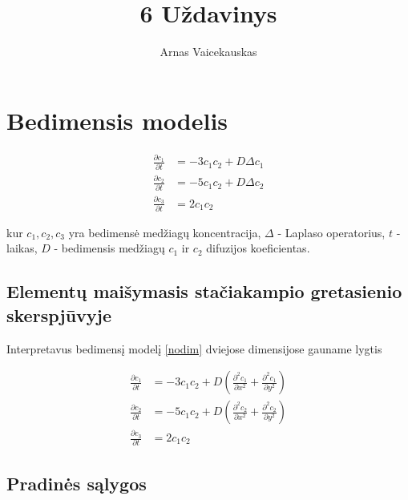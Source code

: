 \documentclass{article}
\title{6 Uždavinys}
\author{Arnas Vaicekauskas}
\begin{document}
\maketitle

\section{Bedimensis modelis}

\begin{subequations} \label{nodim}
    \begin{align}
    \frac{\partial c_1}{\partial t}&=-3c_1c_2+D\Delta c_1\\
    \frac{\partial c_2}{\partial t}&=-5c_1c_2+D\Delta c_2\\
    \frac{\partial c_3}{\partial t}&=2c_1c_2
    \end{align}
\end{subequations}

kur $c_1,c_2,c_3$ yra bedimensė medžiagų koncentracija, 
$\Delta$ - Laplaso operatorius, $t$ - laikas, 
$D$ - bedimensis medžiagų $c_1$ ir $c_2$ difuzijos koeficientas.

\subsection{Elementų maišymasis stačiakampio gretasienio skerspjūvyje}

Interpretavus bedimensį modelį \eqref{nodim} dviejose dimensijose gauname lygtis

\begin{subequations} \label{nodim}
    \begin{align}
    \frac{\partial c_1}{\partial t}&=-3c_1c_2+D\left(\frac{\partial^2c_1}{\partial x^2}+\frac{\partial^2c_1}{\partial y^2}\right)\\
    \frac{\partial c_2}{\partial t}&=-5c_1c_2+D\left(\frac{\partial^2c_2}{\partial x^2}+\frac{\partial^2c_2}{\partial y^2}\right)\\
    \frac{\partial c_3}{\partial t}&=2c_1c_2
    \end{align}
\end{subequations}

\subsection{Pradinės sąlygos}
\end{document}
